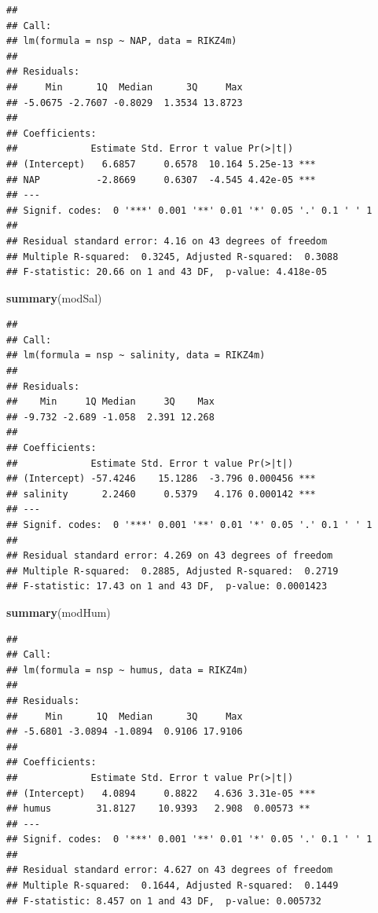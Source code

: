 \documentclass[
]{book}
\newenvironment{Shaded}{\begin{snugshade}}{\end{snugshade}}
\newcommand{\FunctionTok}[1]{\textcolor[rgb]{0.13,0.29,0.53}{\textbf{#1}}}
\newcommand{\NormalTok}[1]{#1}
\begin{document}
\begin{verbatim}
## 
## Call:
## lm(formula = nsp ~ NAP, data = RIKZ4m)
## 
## Residuals:
##     Min      1Q  Median      3Q     Max 
## -5.0675 -2.7607 -0.8029  1.3534 13.8723 
## 
## Coefficients:
##             Estimate Std. Error t value Pr(>|t|)    
## (Intercept)   6.6857     0.6578  10.164 5.25e-13 ***
## NAP          -2.8669     0.6307  -4.545 4.42e-05 ***
## ---
## Signif. codes:  0 '***' 0.001 '**' 0.01 '*' 0.05 '.' 0.1 ' ' 1
## 
## Residual standard error: 4.16 on 43 degrees of freedom
## Multiple R-squared:  0.3245, Adjusted R-squared:  0.3088 
## F-statistic: 20.66 on 1 and 43 DF,  p-value: 4.418e-05
\end{verbatim}

\begin{Shaded}
\begin{Highlighting}[]
\FunctionTok{summary}\NormalTok{(modSal)}
\end{Highlighting}
\end{Shaded}

\begin{verbatim}
## 
## Call:
## lm(formula = nsp ~ salinity, data = RIKZ4m)
## 
## Residuals:
##    Min     1Q Median     3Q    Max 
## -9.732 -2.689 -1.058  2.391 12.268 
## 
## Coefficients:
##             Estimate Std. Error t value Pr(>|t|)    
## (Intercept) -57.4246    15.1286  -3.796 0.000456 ***
## salinity      2.2460     0.5379   4.176 0.000142 ***
## ---
## Signif. codes:  0 '***' 0.001 '**' 0.01 '*' 0.05 '.' 0.1 ' ' 1
## 
## Residual standard error: 4.269 on 43 degrees of freedom
## Multiple R-squared:  0.2885, Adjusted R-squared:  0.2719 
## F-statistic: 17.43 on 1 and 43 DF,  p-value: 0.0001423
\end{verbatim}

\begin{Shaded}
\begin{Highlighting}[]
\FunctionTok{summary}\NormalTok{(modHum)}
\end{Highlighting}
\end{Shaded}

\begin{verbatim}
## 
## Call:
## lm(formula = nsp ~ humus, data = RIKZ4m)
## 
## Residuals:
##     Min      1Q  Median      3Q     Max 
## -5.6801 -3.0894 -1.0894  0.9106 17.9106 
## 
## Coefficients:
##             Estimate Std. Error t value Pr(>|t|)    
## (Intercept)   4.0894     0.8822   4.636 3.31e-05 ***
## humus        31.8127    10.9393   2.908  0.00573 ** 
## ---
## Signif. codes:  0 '***' 0.001 '**' 0.01 '*' 0.05 '.' 0.1 ' ' 1
## 
## Residual standard error: 4.627 on 43 degrees of freedom
## Multiple R-squared:  0.1644, Adjusted R-squared:  0.1449 
## F-statistic: 8.457 on 1 and 43 DF,  p-value: 0.005732
\end{verbatim}
\end{document}
